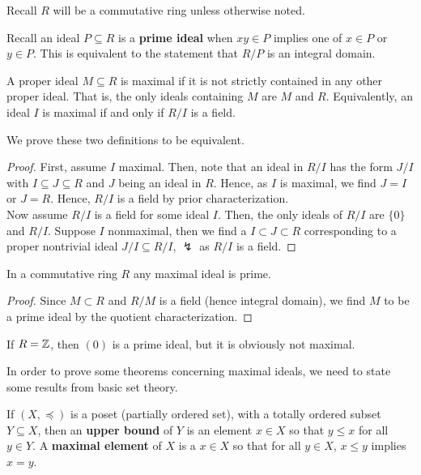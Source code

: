Recall \(R\) will be a commutative ring unless otherwise noted.
\begin{definition}
	Recall an ideal \(P \subseteq R\) is a \textbf{prime ideal} when \(xy \in P\) implies one of \(x \in P\) or \(y \in P\). This is equivalent to the statement that \(R / P\) is an integral domain.
\end{definition}
\begin{definition}
	A proper ideal \(M \subseteq R\) is maximal if it is not strictly contained in any other proper ideal. That is, the only ideals containing \(M\) are \(M\) and \(R\). Equivalently, an ideal \(I\) is maximal if and only if \(R / I\)  is a field.
\end{definition}
We prove these two definitions to be equivalent.
\begin{proof}
	First, assume \(I\) maximal. Then, note that an ideal in \(R / I\) has the form \(J / I\) with \(I \subseteq J \subseteq R\) and \(J\) being an ideal in \(R\). Hence, as \(I\) is maximal, we find \(J = I\) or \(J = R\). Hence, \(R / I\) is a field by  prior characterization.\\
	Now assume \(R / I\) is a field for some ideal \(I\). Then, the only ideals of \(R / I\) are \(\{0\} \) and \(R / I\). Suppose \(I\) nonmaximal, then we find a \(I \subset J \subset R\) corresponding to a proper nontrivial ideal \(J / I \subseteq R / I\), \(\lightning\) as \(R / I\) is a field.
\end{proof}
\begin{proposition}
	In a commutative ring \(R\) any maximal ideal is prime.
\end{proposition}
\begin{proof}
	Since \(M \subset R\) and \(R / M\) is a field (hence integral domain), we find \(M \) to be a prime ideal by the quotient characterization.
\end{proof}
\begin{example}
	If \(R = \mathbb{Z}\), then \(\left( 0 \right) \) is a prime ideal, but it is obviously not maximal.
\end{example}
In order to prove some theorems concerning maximal ideals, we need to state some results from basic set theory.
\begin{definition}
	If \(\left( X, \preceq \right) \) is a poset (partially ordered set), with a totally ordered subset \(Y \subseteq X\), then an \textbf{upper bound} of \(Y\) is an element \( x \in X\) so that \(y \le x\) for all \(y \in Y\). A \textbf{maximal element} of \(X\) is a \(x \in X\) so that for all \(y \in X\), \(x \le y\) implies \(x = y\).
\end{definition}
